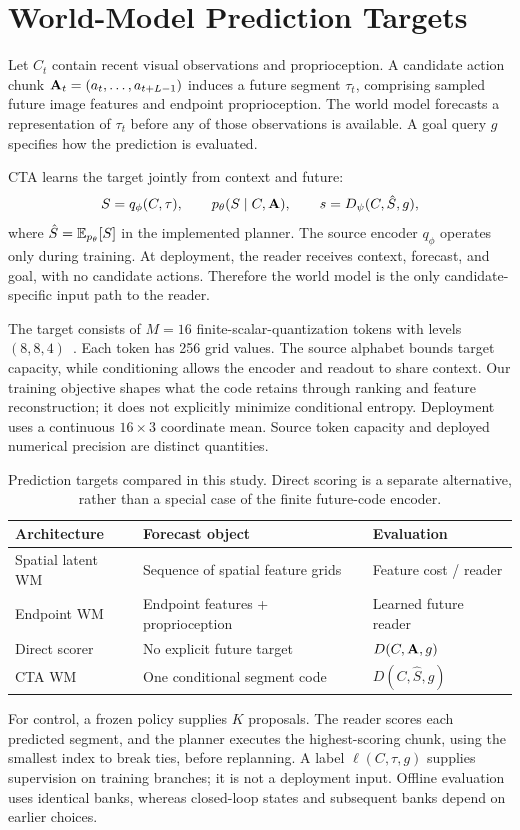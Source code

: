 \section{World-Model Prediction Targets}
\label{sec:problem}
Let $C_t$ contain recent visual observations and proprioception. A candidate action chunk $\mathbf{A}_t=(a_t,\ldots,a_{t+L-1})$ induces a future segment $\tau_t$, comprising sampled future image features and endpoint proprioception. The world model forecasts a representation of $\tau_t$ before any of those observations is available. A goal query $g$ specifies how the prediction is evaluated.

CTA learns the target jointly from context and future:
\begin{equation}
S=q_\phi(C,\tau),\qquad
p_\theta(S\mid C,\mathbf{A}),\qquad
s=D_\psi(C,\hat S,g),
\label{eq:contract}
\end{equation}
where $\hat S=\mathbb{E}_{p_\theta}[S]$ in the implemented planner. The source encoder $q_\phi$ operates only during training. At deployment, the reader receives context, forecast, and goal, with no candidate actions. Therefore the world model is the only candidate-specific input path to the reader.

The target consists of $M=16$ finite-scalar-quantization tokens with levels $(8,8,4)$~\cite{mentzer2024fsq}. Each token has 256 grid values. The source alphabet bounds target capacity, while conditioning allows the encoder and readout to share context. Our training objective shapes what the code retains through ranking and feature reconstruction; it does not explicitly minimize conditional entropy. Deployment uses a continuous $16\times3$ coordinate mean. Source token capacity and deployed numerical precision are distinct quantities.

\begin{table}[t]
\centering\small
\setlength{\tabcolsep}{3pt}
\begin{tabular}{p{.25\linewidth}p{.36\linewidth}p{.29\linewidth}}
\toprule
Architecture & Forecast object & Evaluation \\
\midrule
Spatial latent WM & Sequence of spatial feature grids & Feature cost / reader \\
Endpoint WM & Endpoint features + proprioception & Learned future reader \\
Direct scorer & No explicit future target & $D(C,\mathbf{A},g)$ \\
CTA WM & One conditional segment code & $D(C,\hat S,g)$ \\
\bottomrule
\end{tabular}
\caption{Prediction targets compared in this study. Direct scoring is a separate alternative, rather than a special case of the finite future-code encoder.}
\label{tab:targets}
\end{table}

For control, a frozen policy supplies $K$ proposals. The reader scores each predicted segment, and the planner executes the highest-scoring chunk, using the smallest index to break ties, before replanning. A label $\ell(C,\tau,g)$ supplies supervision on training branches; it is not a deployment input. Offline evaluation uses identical banks, whereas closed-loop states and subsequent banks depend on earlier choices.
